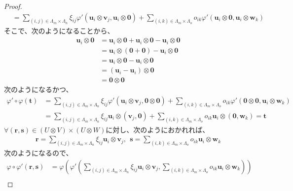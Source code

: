 \documentclass[dvipdfmx]{jsarticle}
\begin{document}
\begin{proof}
\begin{align*}
&= \sum_{(i,j) \in \varLambda_{m} \times \varLambda_{n}} {\xi_{ij}\varphi'\left( \mathbf{u}_{i} \otimes \mathbf{v}_{j},\mathbf{u}_{i} \otimes \mathbf{0} \right)} + \sum_{(i,k) \in \varLambda_{m} \times \varLambda_{o}} {o_{ik}\varphi'\left( \mathbf{u}_{i} \otimes \mathbf{0},\mathbf{u}_{i} \otimes \mathbf{w}_{k} \right)}
\end{align*}
そこで、次のようになることから、
\begin{align*}
\mathbf{u}_{i} \otimes \mathbf{0} &= \mathbf{u}_{i} \otimes \mathbf{0} + \mathbf{u}_{i} \otimes \mathbf{0} - \mathbf{u}_{i} \otimes \mathbf{0}\\
&= \mathbf{u}_{i} \otimes \left( \mathbf{0} + \mathbf{0} \right) - \mathbf{u}_{i} \otimes \mathbf{0}\\
&= \mathbf{u}_{i} \otimes \mathbf{0} - \mathbf{u}_{i} \otimes \mathbf{0}\\
&= \left( \mathbf{u}_{i} - \mathbf{u}_{i} \right) \otimes \mathbf{0}\\
&= \mathbf{0} \otimes \mathbf{0}
\end{align*}
次のようになるかつ、
\begin{align*}
\varphi' \circ \varphi\left( \mathbf{t} \right) &= \sum_{(i,j) \in \varLambda_{m} \times \varLambda_{n}} {\xi_{ij}\varphi'\left( \mathbf{u}_{i} \otimes \mathbf{v}_{j},\mathbf{0} \otimes \mathbf{0} \right)} + \sum_{(i,k) \in \varLambda_{m} \times \varLambda_{o}} {o_{ik}\varphi'\left( \mathbf{0} \otimes \mathbf{0},\mathbf{u}_{i} \otimes \mathbf{w}_{k} \right)}\\
&= \sum_{(i,j) \in \varLambda_{m} \times \varLambda_{n}} {\xi_{ij}\mathbf{u}_{i} \otimes \left( \mathbf{v}_{j},\mathbf{0} \right)} + \sum_{(i,k) \in \varLambda_{m} \times \varLambda_{o}} {o_{ik}\mathbf{u}_{i} \otimes \left( \mathbf{0},\mathbf{w}_{k} \right)} = \mathbf{t}
\end{align*}
$\forall\left( \mathbf{r},\mathbf{s} \right) \in (U \otimes V) \times (U \otimes W)$に対し、次のようにおかれれば、
\begin{align*}
\mathbf{r} = \sum_{(i,j) \in \varLambda_{m} \times \varLambda_{n}} {\xi_{ij}\mathbf{u}_{i} \otimes \mathbf{v}_{j}},\ \ \mathbf{s} = \sum_{(i,k) \in \varLambda_{m} \times \varLambda_{o}} {o_{ik}\mathbf{u}_{i} \otimes \mathbf{w}_{k}}
\end{align*}
次のようになるので、
\begin{align*}
\varphi \circ \varphi'\left( \mathbf{r},\mathbf{s} \right) &= \varphi\left( \varphi'\left( \sum_{(i,j) \in \varLambda_{m} \times \varLambda_{n}} {\xi_{ij}\mathbf{u}_{i} \otimes \mathbf{v}_{j}},\sum_{(i,k) \in \varLambda_{m} \times \varLambda_{o}} {o_{ik}\mathbf{u}_{i} \otimes \mathbf{w}_{k}} \right) \right)\\

\end{align*}
\end{proof}
\end{document}
